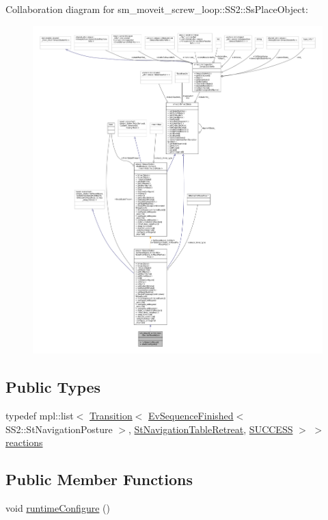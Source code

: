 Collaboration diagram for sm\+\_\+moveit\+\_\+screw\+\_\+loop\+:\+:S\+S2\+:\+:Ss\+Place\+Object\+:
\nopagebreak
\begin{figure}[H]
\begin{center}
\leavevmode
\includegraphics[width=350pt]{structsm__moveit__screw__loop_1_1SS2_1_1SsPlaceObject__coll__graph}
\end{center}
\end{figure}
\subsection*{Public Types}
\begin{DoxyCompactItemize}
\item 
typedef mpl\+::list$<$ \hyperlink{classsmacc_1_1Transition}{Transition}$<$ \hyperlink{structsmacc_1_1default__events_1_1EvSequenceFinished}{Ev\+Sequence\+Finished}$<$ S\+S2\+::\+St\+Navigation\+Posture $>$, \hyperlink{structsm__moveit__screw__loop_1_1StNavigationTableRetreat}{St\+Navigation\+Table\+Retreat}, \hyperlink{structsmacc_1_1default__transition__tags_1_1SUCCESS}{S\+U\+C\+C\+E\+SS} $>$ $>$ \hyperlink{structsm__moveit__screw__loop_1_1SS2_1_1SsPlaceObject_a157c60be6e5eae6dc682bc5d163ce9ce}{reactions}
\end{DoxyCompactItemize}
\subsection*{Public Member Functions}
\begin{DoxyCompactItemize}
\item 
void \hyperlink{structsm__moveit__screw__loop_1_1SS2_1_1SsPlaceObject_abe9c840817a2adb42cdeaafd7353643e}{runtime\+Configure} ()
\end{DoxyCompactItemize}
